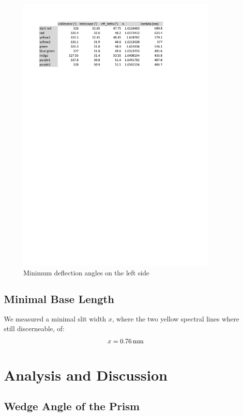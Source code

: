 \documentclass{scrreprt}
\newcommand{\unit}[1]{\ensuremath{\, \mathrm{#1}}}
\begin{document}
\begin{figure}[H]
	\centering
  \includegraphics[width=0.9\textwidth]{diag/left.pdf}
	\caption{Minimum deflection angles on the left side}
	\label{fig:left}
\end{figure}
\subsection{Minimal Base Length}
We measured a minimal slit width $x$, where the two yellow spectral lines where still discerneable, of:
\begin{equation}
	x = 0.76\unit{mm}
\notag
\end{equation}

\section{Analysis and Discussion}

\subsection{Wedge Angle of the Prism}
\end{document}
